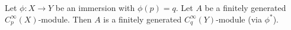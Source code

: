 Let $\phi: X \to Y$ be an immersion with $\phi(p) = q$. Let $A$ be a finitely generated $C_p^\infty(X)$-module. Then $A$ is a finitely generated $C_q^\infty(Y)$-module (via $\phi^*$).
